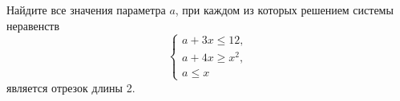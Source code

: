 \begin{ex}
	\begin{condition}
		Найдите все значения параметра \( a \), при каждом из которых решением системы неравенств
		\[ \left\{
		\begin{array}{l}
			a+3x\le12,\\
			a+4x\ge x^2,\\
			a\le x
		\end{array}
		\right. \]
		является отрезок длины 2.
	\end{condition}
\end{ex}